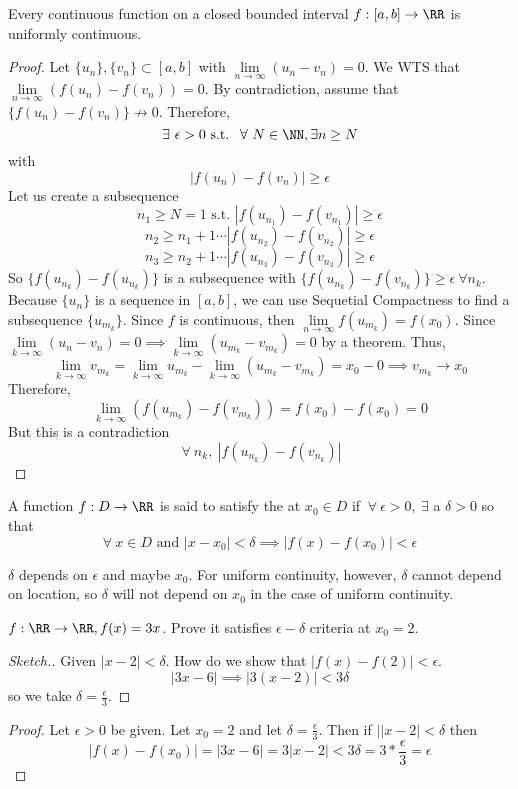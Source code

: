 \documentclass[12pt]{scrartcl}
\newcommand{\Lim}{\underset{n\to\infty}{\lim}}
\begin{document}
\begin{theorem}
  Every continuous function on a closed bounded interval $f: [a,b] \to \RR$ is uniformly continuous.
  \begin{proof}
    Let $\{u_n\}, \{v_n\} \subset [a,b]$ with $\Lim (u_n - v_n)= 0$. We WTS that 
    $\Lim (f(u_n) - f(v_n)) = 0$. By contradiction, assume that $\{f(u_n) - f(v_n)\} \not \to 0$. 
    Therefore, 
    \[\exists \ \epsilon > 0 \text{ s.t. } \ \forall \ N \in \NN, \exists n \geq N\] with 
    \[|f(u_n) - f(v_n)| \geq \epsilon\]
    Let us create a subsequence
    \[n_1 \geq N = 1 \text{ s.t. } |f(u_{n_1}) - f(v_{n_1})| \geq \epsilon\]
    \[n_2 \geq n_1 + 1 \cdots |f(u_{n_2}) - f(v_{n_2})| \geq \epsilon\]
    \[n_3 \geq n_2 + 1 \cdots |f(u_{n_3}) - f(v_{n_3})| \geq \epsilon\]
    So $\{f(u_{n_k}) - f(u_{n_k})\}$ is a subsequence with 
    $\{f(u_{n_k}) - f(v_{n_k})\} \geq \epsilon \ \forall n_k$. Because $\{u_n\}$ is a 
    sequence in $[a, b]$, we can use Sequetial Compactness to find a subsequence 
    $\{u_{m_k}\}$. Since $f$ is continuous, then $\Lim f(u_{m_k}) = f(x_0)$.
    Since $\underset{k\to\infty}{\lim}(u_n - v_n) = 0 \implies \underset{k\to\infty}{\lim}(u_{m_k} - v_{m_k}) = 0$
    by a theorem. Thus, 
    \[\lim_{k\to\infty} v_{m_k} = \lim_{k\to\infty}u_{m_k} - \lim_{k\to\infty}(u_{m_k} - v_{m_k}) = x_0 - 0 \implies v_{m_k} \to x_0\]
    Therefore, 
    \[\lim_{k\to\infty}(f(u_{m_k}) - f(v_{m_k})) = f(x_0) - f(x_0) = 0\]
    But this is a contradiction 
    \[\ \forall \ n_k, \ |f(u_{n_k}) - f(v_{n_k})|\]
  \end{proof}
\end{theorem}

\begin{definition}
  A function $f: D \to\RR$ is said to satisfy the  at $x_0 \in D$ 
  if $\ \forall \ \epsilon > 0, \ \exists$ a $\delta > 0$ so that 
  \[\forall \ x \in D \text{ and } |x-x_0| < \delta \implies |f(x) - f(x_0)| < \epsilon\]
\end{definition}

\begin{note}
  $\delta$ depends on $\epsilon$ and maybe $x_0$. For uniform continuity, however, $\delta$ 
  cannot depend on location, so $\delta$ will not depend on $x_0$ in the case of 
  uniform continuity.
\end{note}

\begin{example}
  $f: \RR \to \RR, f(x) = 3x$. Prove it satisfies $\epsilon-\delta$ criteria at 
  $x_0 = 2$. 

  \begin{proof}[Sketch.]
    Given $|x - 2| < \delta$. How do we show that $|f(x) - f(2)| < \epsilon$. 
    \[|3x-6| \implies |3(x-2)| < 3\delta\]
    so we take $\delta = \frac{\epsilon}{3}$. 
  \end{proof}

  \begin{proof}
    Let $\epsilon > 0$ be given. Let $x_0 = 2$ and let $\delta = \frac{\epsilon}{3}$. 
    Then if $||x-2| < \delta$ then 
    \[|f(x) - f(x_0)| = |3x-6| = 3|x-2| < 3\delta = 3 * \frac{\epsilon}{3} = \epsilon\]
  \end{proof}
\end{example}
\end{document}
